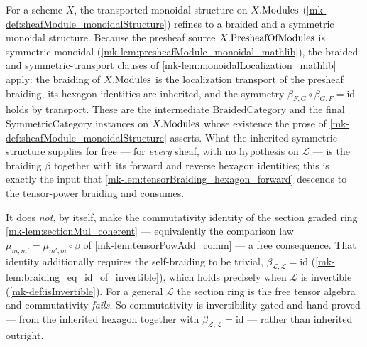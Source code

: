 \begin{corollary}
  \label{mk-cor:sheafModule_braided_symmetric}

  For a scheme \(X\), the transported monoidal structure on \(X.\mathrm{Modules}\)
  (\ref{mk-def:sheafModule_monoidalStructure}) refines to a braided and a symmetric
  monoidal structure. Because the presheaf source \(X.\mathrm{PresheafOfModules}\) is symmetric
  monoidal (\ref{mk-lem:presheafModule_monoidal_mathlib}), the braided- and
  symmetric-transport clauses of \ref{mk-lem:monoidalLocalization_mathlib} apply:
  the braiding of \(X.\mathrm{Modules}\) is the localization transport of the presheaf
  braiding, its hexagon identities are inherited, and the symmetry
  \(\beta_{F,G} \circ \beta_{G,F} = \mathrm{id}\) holds by transport. These are
  the intermediate \(\mathrm{BraidedCategory}\) and the final
  \(\mathrm{SymmetricCategory}\) instances on \(X.\mathrm{Modules}\) whose existence the
  prose of \ref{mk-def:sheafModule_monoidalStructure} asserts. What the inherited
  symmetric structure supplies for free --- for \emph{every} sheaf, with no
  hypothesis on \(\mathcal{L}\) --- is the braiding \(\beta\) together with its
  forward and reverse hexagon identities; this is exactly the input that
  \ref{mk-lem:tensorBraiding_hexagon_forward} descends to the tensor-power braiding
  and consumes.

  It does \emph{not}, by itself, make the commutativity identity of the section
  graded ring \ref{mk-lem:sectionMul_coherent} --- equivalently the comparison law
  \(\mu_{m,m'} = \mu_{m',m} \circ \beta\) of \ref{mk-lem:tensorPowAdd_comm} --- a
  free consequence. That identity additionally requires the self-braiding to be
  trivial, \(\beta_{\mathcal{L},\mathcal{L}} = \mathrm{id}\)
  (\ref{mk-lem:braiding_eq_id_of_invertible}), which holds precisely when
  \(\mathcal{L}\) is invertible (\ref{mk-def:isInvertible}). For a general
  \(\mathcal{L}\) the section ring is the free tensor algebra and commutativity
  \emph{fails}. So commutativity is invertibility-gated and hand-proved --- from
  the inherited hexagon together with \(\beta_{\mathcal{L},\mathcal{L}} =
  \mathrm{id}\) --- rather than inherited outright.
\end{corollary}


